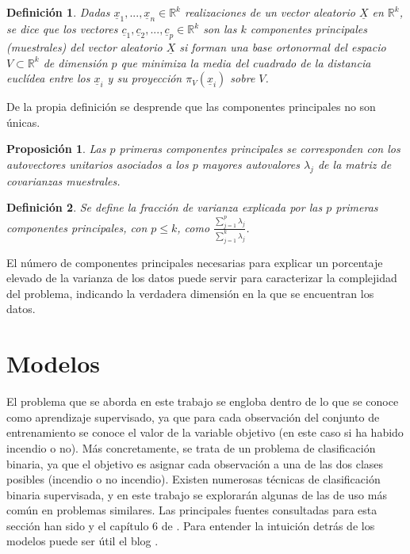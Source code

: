\documentclass[12pt,a4paper,]{book}
\newcounter{dummy}
\numberwithin{dummy}{section}
\theoremstyle{ocrenumbox}
\theoremstyle{blacknumex}
\theoremstyle{blacknumbox}
\newtheorem{definitionT}{Definición}[section]  %
\theoremstyle{ocrenum}
\newtheorem{proposition}[dummy]{Proposición} %
\newenvironment{definition}{\begin{dBox}\begin{definitionT}}{\end{definitionT}\end{dBox}}
\theoremstyle{ocrenum}
\begin{document}
\begin{definition}
Dadas $\underline x_1, ..., \underline x_n \in \mathbb{R}^k$ realizaciones de un vector aleatorio $\underline X$ en $\mathbb{R}^k$, se dice que los vectores $\underline c_1, \underline c_2,...,\underline c_p \in \mathbb{R}^k$ son las $k$ componentes principales (muestrales) del vector aleatorio $\underline X$ si forman una base ortonormal del espacio $V \subset \mathbb{R}^k$ de dimensión $p$ que minimiza la media del cuadrado de la distancia euclídea entre los $\underline x_i$ y su proyección $\pi_{V}(\underline x_i)$ sobre $V$.
\end{definition}

De la propia definición se desprende que las componentes principales no
son únicas.

\begin{proposition}
Las $p$ primeras componentes principales se corresponden con los autovectores unitarios asociados a los $p$ mayores autovalores $\lambda_j$ de la matriz de covarianzas muestrales. 
\end{proposition}

\begin{definition}
Se define la fracción de varianza explicada por las $p$ primeras componentes principales, con $p \le k$, como $\frac{\sum_{j=1}^p \lambda_j}{\sum_{j=1}^k \lambda_j}$.
\end{definition}

El número de componentes principales necesarias para explicar un
porcentaje elevado de la varianza de los datos puede servir para
caracterizar la complejidad del problema, indicando la verdadera
dimensión en la que se encuentran los datos.

\hypertarget{modelos}{%
\section{Modelos}\label{modelos}}

El problema que se aborda en este trabajo se engloba dentro de lo que se
conoce como aprendizaje supervisado, ya que para cada observación del
conjunto de entrenamiento se conoce el valor de la variable objetivo (en
este caso si ha habido incendio o no). Más concretamente, se trata de un
problema de clasificación binaria, ya que el objetivo es asignar cada
observación a una de las dos clases posibles (incendio o no incendio).
Existen numerosas técnicas de clasificación binaria supervisada, y en
este trabajo se explorarán algunas de las de uso más común en problemas
similares. Las principales fuentes consultadas para esta sección han
sido \citet{hastie2009elements} y el capítulo 6 de
\citet{MLmodelSuthaharan}. Para entender la intuición detrás de los
modelos puede ser útil el blog \citet{eight2late}.
\end{document}

